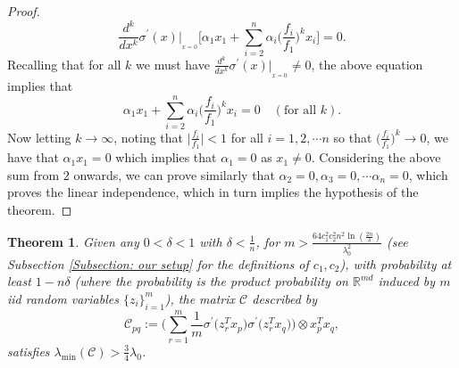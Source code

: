 \documentclass[a4paper,11pt]{amsart}
\theoremstyle{definition}
\theoremstyle{plain}
\newtheorem{thm}[dfn]{Theorem}
\theoremstyle{remark}
\newcommand{\IR}{\mathbb{R}}
\newcommand{\ot}{\otimes}
\begin{document}
\begin{proof}
\[
\frac{d^k}{dx^k}\sigma^\prime(x)|_{_{x=0}}\Big[\alpha_1x_1+\sum_{i=2}^n\alpha_i\Big(\frac{f_i}{f_1}\Big)^kx_i\Big]=0. 
\]
Recalling that for all $k$ we must have $\frac{d^k}{dx^k}\sigma^\prime(x)|_{_{x=0}}\neq0$, the above equation implies that 
\[
\alpha_1x_1+\sum_{i=2}^n\alpha_i\Big(\frac{f_i}{f_1}\Big)^kx_i=0\quad(\text{for all $k$}). 
\]
Now letting $k\longrightarrow\infty$, noting that $\Big|\frac{f_i}{f_1}\Big|<1$ for all $i=1,2,\cdots n$ so that $\Big(\frac{f_i}{f_1}\Big)^k\longrightarrow0$, we have that $\alpha_1x_1=0$ which implies that $\alpha_1=0$ as $x_1\neq0$. Considering the above sum from $2$ onwards, we can prove similarly that $\alpha_2=0,\alpha_3=0,\cdots\alpha_n=0$, which proves the linear independence, which in turn implies the hypothesis of the theorem.
\end{proof}

\begin{thm}\label{Theorem: with probability 1-ndelta the Gramian matrix is positive definite}
Given any $0<\delta<1$ with $\delta<\frac{1}{n}$, for $m>\frac{64c_1^2c_2^2n^2\ln(\frac{2n}{\delta})}{\lambda_0^2}$ (see Subsection \ref{Subsection: our setup} for the definitions of $c_1,c_2$), with probability at least $1-n\delta$ (where the probability is the product probability on $\IR^{md}$ induced by $m$ iid random variables $\{z_i\}_{i=1}^m$), the  matrix $\mathcal{C}$ described by 
\[
\mathcal{C}_{pq}:=\Big(\sum_{r=1}^m \frac{1}{m}\sigma^\prime\Big(z_r^Tx_p\Big)\sigma^\prime\Big(z_r^Tx_q\Big)\Big)\ot x_p^Tx_q,
\]
satisfies $\lambda_{\min}(\mathcal{C})>\frac{3}{4}\lambda_0$.
\end{thm}
\end{document}
